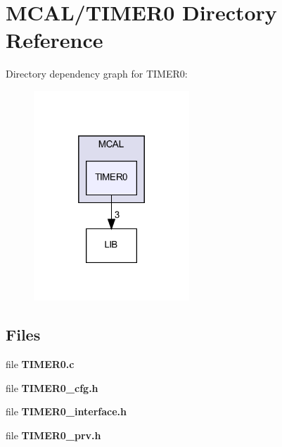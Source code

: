 \section{M\+C\+A\+L/\+T\+I\+M\+E\+R0 Directory Reference}
\label{dir_b88f1dc9287a5bc2a8bff2eace05ec04}
Directory dependency graph for T\+I\+M\+E\+R0\+:
\nopagebreak
\begin{figure}[H]
\begin{center}
\leavevmode
\includegraphics[width=166pt]{dir_b88f1dc9287a5bc2a8bff2eace05ec04_dep}
\end{center}
\end{figure}
\subsection*{Files}
\begin{DoxyCompactItemize}
\item 
file \textbf{ T\+I\+M\+E\+R0.\+c}
\item 
file \textbf{ T\+I\+M\+E\+R0\+\_\+cfg.\+h}
\item 
file \textbf{ T\+I\+M\+E\+R0\+\_\+interface.\+h}
\item 
file \textbf{ T\+I\+M\+E\+R0\+\_\+prv.\+h}
\end{DoxyCompactItemize}
